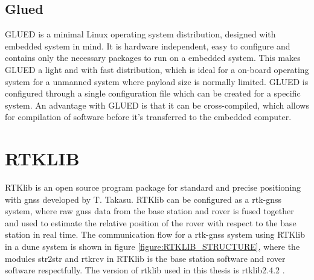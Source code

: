 \subsection{Glued}
GLUED is a minimal Linux operating system distribution, designed with embedded system in mind. It is hardware independent, easy to configure and contains only the necessary packages to run on a embedded system. This makes GLUED a light and with fast distribution, which is ideal for a on-board operating system for a unmanned system where payload size is normally limited. GLUED is configured through a single configuration file which can be created for a specific system. An advantage with GLUED is that it can be cross-compiled, which allows for compilation of software before it's transferred to the embedded computer.
\section{RTKLIB}\label{ss:Rtklib}
RTKlib \citep{takasu2009development} is an open source program package for standard and precise positioning with \gls{gnss} developed by T. Takasu. RTKlib can be configured as a \gls{rtk-gnss} system, where raw \gls{gnss} data from the base station and rover is fused together and used to estimate the relative position of the rover with respect to the base station in real time. The communication flow for a \gls{rtk-gnss} system using RTKlib in a \gls{dune} system is shown in figure \ref{figure:RTKLIB_STRUCTURE}, where the modules str2str and rtkrcv in RTKlib is the base station software and rover software respectfully. The version of \gls{rtklib} used in this thesis is \gls{rtklib}2.4.2 \citep{Rtklib242}.

